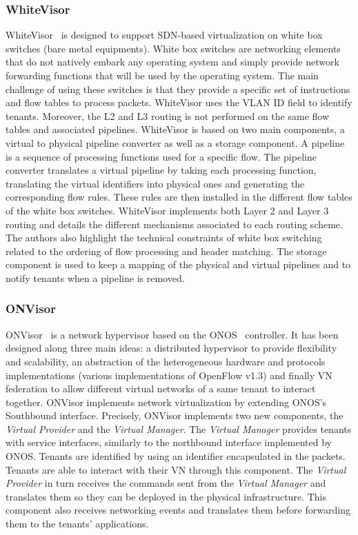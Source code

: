 \subsubsection{WhiteVisor}
WhiteVisor~\cite{whitevisor-Yu2019} is designed to support SDN-based virtualization on white box switches (\ie bare metal equipments).
White box switches are networking elements that do not natively embark any operating system and simply provide network forwarding functions that will be used by the operating system.  
The main challenge of using these switches is that they provide a specific set of instructions and flow tables to process packets. 
WhiteVisor uses the VLAN ID field to identify tenants.
Moreover, the L2 and L3 routing is not performed on the same flow tables and associated pipelines.
WhiteVisor is based on two main components, a virtual to physical pipeline converter as well as a storage component.
A pipeline is a sequence of processing functions used for a specific flow.
The pipeline converter translates a virtual pipeline by taking each processing function, translating the virtual identifiers into physical ones and generating the corresponding flow rules. These rules are then installed in the different flow tables of the white box switches. WhiteVisor implements both Layer 2 and Layer 3 routing and details the different mechanisms associated to each routing scheme. The authors also highlight the technical constraints of white box switching related to the ordering of flow processing and header matching. The storage component is used to keep a mapping of the physical and virtual pipelines and to notify tenants when a pipeline is removed. 


\subsubsection{ONVisor}
ONVisor~\cite{ONVisor-Han2018} is a network hypervisor based on the ONOS~\cite{onos-Berde2014a} controller.
It has been designed along three main ideas: a distributed hypervisor to provide flexibility and scalability, an abstraction of the heterogeneous hardware and protocols implementations (\eg various implementations of OpenFlow v1.3)  and finally VN federation to allow different virtual networks of a same tenant to interact together.
ONVisor implements network virtualization by extending ONOS's Southbound interface.
Precisely, ONVisor implements two new components, the \textit{Virtual Provider} and the \textit{Virtual Manager}.
The \textit{Virtual Manager} provides tenants with service interfaces, similarly to the northbound interface implemented by ONOS. 
Tenants are identified by using an identifier encapsulated in the packets.
Tenants are able to interact with their VN through this component.
The \textit{Virtual Provider} in turn receives the commands sent from the \textit{Virtual Manager} and translates them so they can be deployed in the physical infrastructure. This component also receives networking events and translates them before forwarding them to the tenants' applications.

